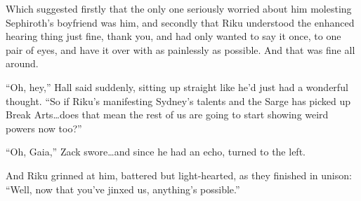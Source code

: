 Which suggested firstly that the only one seriously worried about him molesting Sephiroth's boyfriend was him, and secondly that Riku understood the enhanced hearing thing just fine, thank you, and had only wanted to say it once, to one pair of eyes, and have it over with as painlessly as possible. And that was fine all around.

``Oh, hey,'' Hall said suddenly, sitting up straight like he'd just had a wonderful thought. ``So if Riku's manifesting Sydney's talents and the Sarge has picked up Break Arts\ldots does that mean the rest of us are going to start showing weird powers now too?''

``Oh, Gaia,'' Zack swore\ldots and since he had an echo, turned to the left.

And Riku grinned at him, battered but light-hearted, as they finished in unison: ``Well, now that you've jinxed us, anything's possible.''

